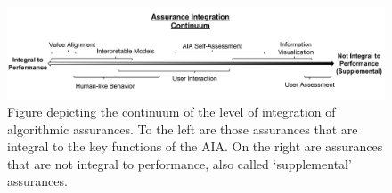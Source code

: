     \begin{figure}[!t]%
        \centering
        \includegraphics[width=1.0\textwidth]{Figures/Assurance_Integration.pdf}
        \caption{Figure depicting the continuum of the level of integration of algorithmic assurances. To the left are those assurances that are integral to the key functions of the AIA. On the right are assurances that are not integral to performance, also called `supplemental' assurances.}
        \label{fig:assurance_continuum}
    \end{figure}









